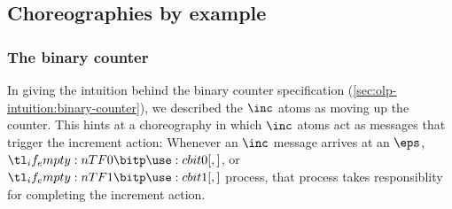 


% 

% 

\subsection{Choreographies by example}\label{sec:chor-by-example}

\subsubsection{The binary counter}\label{sec:chor-example-counter}

In giving the intuition behind the binary counter specification (\cref{sec:olp-intuition:binary-counter}), we described the $\inc$ atoms %
as moving up the counter.
This hints at a choreography in which $\inc$ atoms act as messages that trigger the increment action:
Whenever an $\inc$ message arrives at an $\eps$, $\bit{0}$, or $\bit{1}$ process, that process takes responsiblity for completing the increment action.


